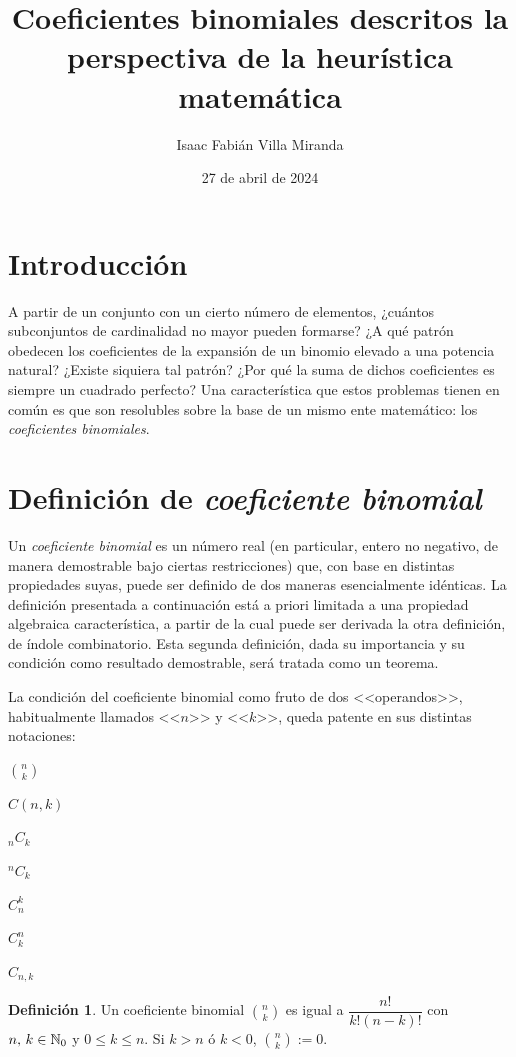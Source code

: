 \documentclass{article}
\title{Coeficientes binomiales descritos la perspectiva de la heurística matemática}
\author{Isaac Fabián Villa Miranda}
\date{27 de abril de 2024}
\theoremstyle{definition}
\newtheorem{defin}{Definición}
\begin{document}
\newcommand{\cbin}[2]{ \displaystyle \binom{#1}{#2} }

\maketitle

\section{Introducción} 
A partir de un conjunto con un cierto número de elementos, ¿cuántos subconjuntos de cardinalidad no mayor pueden formarse? ¿A qué patrón obedecen los coeficientes de la expansión de un binomio elevado a una potencia natural? ¿Existe siquiera tal patrón? ¿Por qué la suma de dichos coeficientes es siempre un cuadrado perfecto? Una característica que estos problemas tienen en común es que son resolubles sobre la base de un mismo ente matemático: los \textit{coeficientes binomiales}.
\section{Definición de \textit{coeficiente binomial}}
Un \textit{coeficiente binomial} es un número real (en particular, entero no negativo, de manera demostrable bajo ciertas restricciones) que, con base en distintas propiedades suyas, puede ser definido de dos maneras esencialmente idénticas. La definición presentada a continuación está a priori limitada a una propiedad algebraica característica, a partir de la cual puede ser derivada la otra definición, de índole combinatorio. Esta segunda definición, dada su importancia y su condición como resultado demostrable, será tratada como un teorema. 

La condición del coeficiente binomial como fruto de dos <<operandos>>, habitualmente llamados <<$n$>> y <<$k$>>, queda patente en sus distintas notaciones:

\begin{multicols}{7}
$ \binom{n}{k}$

$\displaystyle C(n,k)$

$\displaystyle _{n}C_{k}$

$\displaystyle ^{n}C_{k}$

$\displaystyle C^{k} _{n}$

$\displaystyle C^{n} _{k}$

$\displaystyle C_{n,k}$

\end{multicols}

\begin{defin}\label{def1}
Un coeficiente binomial $ \binom{n}{k}$ es igual a $\dfrac{n!}{k!(n-k)!}$ con $n \textnormal{, } k \in \mathbb{N}_{0}$ y $0 \leq k \leq n$. Si $k>n$ ó $k<0$, $ \binom{n}{k} := 0$.
\end{defin}
\end{document}
